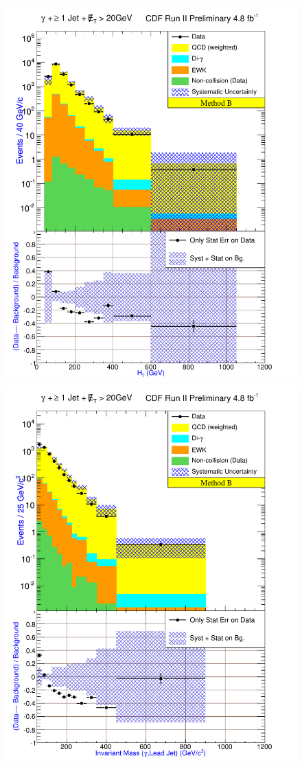 \begin{figure}[h!]
{\includegraphics[keepaspectratio=true, scale=\resultsHistScale]{G30JetsMet20_MtdB_plot1_Ht.pdf}}
{\includegraphics[keepaspectratio=true, scale=\resultsHistScale]{G30JetsMet20_MtdB_plot1_InvMass_pj1.pdf}}

\end{figure}
